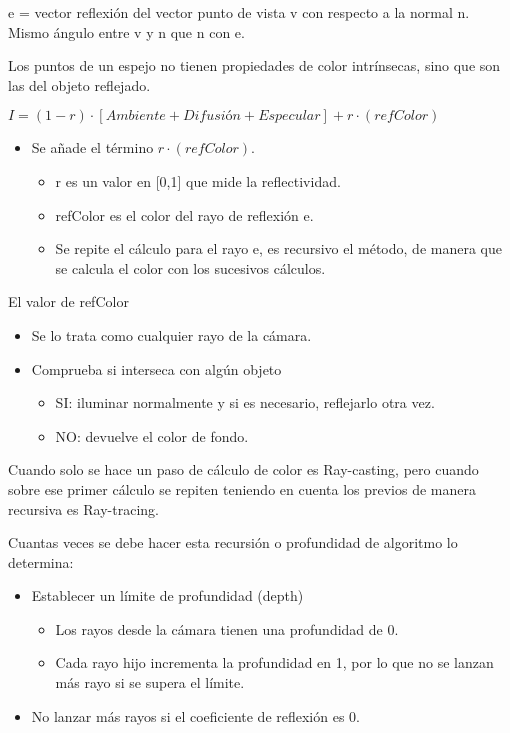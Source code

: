 e = vector reflexión del vector punto de vista v con respecto a la normal n. Mismo ángulo entre v y n que n con e.

Los puntos de un espejo no tienen propiedades de color intrínsecas, sino que son las del objeto reflejado.

$I=(1-r)\cdot[\textit{Ambiente}+\textit{Difusión}+\textit{Especular}]+r\cdot(refColor)$
\pagebreak

\begin{itemize}
    \item Se añade el término $r\cdot(refColor)$.
    \begin{itemize}
        \item r es un valor en [0,1] que mide la reflectividad.
        \item refColor es el color del rayo de reflexión e.
        \item Se repite el cálculo para el rayo e, es recursivo el método, de manera que se calcula el color con los sucesivos cálculos.
    \end{itemize}
\end{itemize}

El valor de refColor
\begin{itemize}
    \item Se lo trata como cualquier rayo de la cámara.
    \item Comprueba si interseca con algún objeto
    \begin{itemize}
        \item SI: iluminar normalmente y si es necesario, reflejarlo otra vez.
        \item NO: devuelve el color de fondo.
    \end{itemize}
\end{itemize}

Cuando solo se hace un paso de cálculo de color es Ray-casting, pero cuando sobre ese primer cálculo se repiten teniendo en cuenta los previos de manera recursiva es Ray-tracing.

Cuantas veces se debe hacer esta recursión o profundidad de algoritmo lo determina:
\begin{itemize}
    \item Establecer un límite de profundidad (depth)
        \begin{itemize}
            \item Los rayos desde la cámara tienen una profundidad de 0.
            \item Cada rayo hijo incrementa la profundidad en 1, por lo que no se lanzan más rayo si se supera el límite.
        \end{itemize}
    \item No lanzar más rayos si el coeficiente de reflexión es 0.
\end{itemize}

